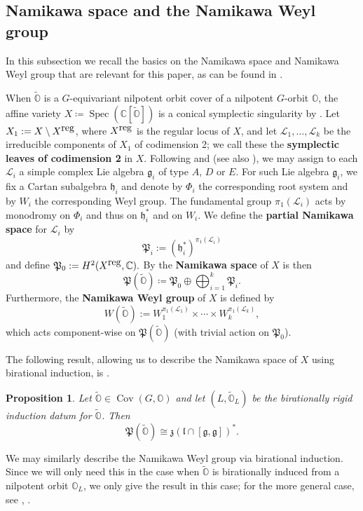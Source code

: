 \documentclass[11pt]{amsart}
\newcommand{\C}{{\mathbb C}}
\renewcommand{\O}{{\mathbb O}}
\newcommand{\g}{{\mathfrak g}}
\newcommand{\h}{{\mathfrak h}}
\renewcommand{\l}{{\mathfrak l}}
\renewcommand{\P}{{\mathfrak P}}
\newcommand{\z}{{\mathfrak z}}
\newcommand{\cL}{{\mathcal L}}
\newcommand{\Spec}{\operatorname{Spec}}
\newcommand{\Cov}{\operatorname{Cov}}
\newcommand{\reg}{{{\mbox{\rm reg}}}}
\newcommand{\covO}{\widetilde{\O}}
\newtheorem{prop}[theorem]{Proposition}
\numberwithin{equation}{section}
\begin{document}
	\subsection{Namikawa space and the Namikawa Weyl group}\label{ss: brc}
	In this subsection we recall the basics on the Namikawa space and Namikawa Weyl group that are relevant for this paper, as can be found in \cite{LoOM,LMM,MM,MMY,Nam11}.
	
	When $\covO$ is a $G$-equivariant nilpotent orbit cover of a nilpotent $G$-orbit $\O$, the affine variety $X\coloneqq \Spec(\C[\covO])$ is a conical symplectic singularity by \cite[Lemma 2.5]{Lo21}. Let $X_1:=X\setminus X^{\tiny \reg}$, where $X^{\tiny \reg}$ is the regular locus of $X$, and let $\cL_1,\ldots,\cL_k$ be the irreducible components of $X_1$ of codimension 2; we call these the {\bf symplectic leaves of codimension 2} in $X$. Following \cite{LoOM} and \cite{Nam11} (see also \cite[\S4.5]{LMM}), we may assign to each $\cL_i$ a simple complex Lie algebra $\g_i$ of type $A$, $D$ or $E$. For such Lie algebra $\g_i$, we fix a Cartan subalgebra $\h_i$ and denote by $\Phi_i$ the corresponding root system and by $W_i$ the corresponding Weyl group. The fundamental group $\pi_1(\cL_i)$ acts by monodromy on $\Phi_i$ and thus on $\h_i^{*}$ and on $W_i$. We define the {\bf partial Namikawa space} for $\cL_i$ by $$\P_i:=(\h_i^{*})^{\pi_1(\cL_i)}$$ and define $\P_0:=H^2(X^{\tiny \reg},\C).$ By \cite[Lemma 2.8]{LoOM} the {\bf Namikawa space} of $X$ is then $$\P(\covO)\coloneqq\P_0\oplus \bigoplus_{i=1}^{k}\P_i.$$  Furthermore, the {\bf Namikawa Weyl group} of $X$ is defined by $$W(\covO):=W_1^{\pi_1(\cL_1)}\times\cdots\times W_k^{\pi_1(\cL_k)},$$ which acts component-wise on $\P(\covO)$ (with trivial action on $\P_0$).
	
	The following result, allowing us to describe the Namikawa space of $X$ using birational induction, is \cite[Proposition 7.2.2(i)]{LMM}.
	\begin{prop}\label{p: NamCent}
		Let $\covO\in\Cov(G,\O)$ and let $(L,\covO_L)$ be the birationally rigid induction datum for $\covO$. Then $$\P(\covO)\cong \z(\l\cap[\g,\g])^{*}.$$ 
	\end{prop}
	
	We may similarly describe the Namikawa Weyl group via birational induction. Since we will only need this in the case when $\covO$ is birationally induced from a nilpotent orbit $\O_L$, we only give the result in this case; for the more general case, see \cite{Lo22}, \cite[\S 7]{LMM}. 
	
\end{document}
